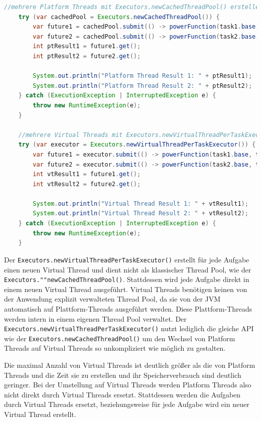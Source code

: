 \documentclass[fontsize=12pt,paper=a4,twoside=semi,parskip=half-,headsepline,headinclude]{scrreprt}
\newcommand{\code}[1]{\texttt{#1}}
\begin{document}
\begin{lstlisting}[language=Java]
	//mehrere Platform Threads mit Executors.newCachedThreadPool() erstellen
	try (var cachedPool = Executors.newCachedThreadPool()) {
		var future1 = cachedPool.submit(() -> powerFunction(task1.base, task1.exponent));
		var future2 = cachedPool.submit(() -> powerFunction(task2.base, task2.exponent));
		int ptResult1 = future1.get();
		int ptResult2 = future2.get();
	
		System.out.println("Platform Thread Result 1: " + ptResult1);
		System.out.println("Platform Thread Result 2: " + ptResult2);
	} catch (ExecutionException | InterruptedException e) {
		throw new RuntimeException(e);
	}

	//mehrere Virtual Threads mit Executors.newVirtualThreadPerTaskExecutor() erstellen
	try (var executor = Executors.newVirtualThreadPerTaskExecutor()) {
		var future1 = executor.submit(() -> powerFunction(task1.base, task1.exponent));
		var future2 = executor.submit(() -> powerFunction(task2.base, task2.exponent));
		int vtResult1 = future1.get();
		int vtResult2 = future2.get();
	
		System.out.println("Virtual Thread Result 1: " + vtResult1);
		System.out.println("Virtual Thread Result 2: " + vtResult2);
	} catch (ExecutionException | InterruptedException e) {
		throw new RuntimeException(e);
	}
\end{lstlisting}
Der \code{Executors.newVirtualThreadPerTaskExecutor()} erstellt für jede Aufgabe einen neuen Virtual Thread und dient nicht als klassischer Thread Pool, wie der \code{Executors.""newCachedThreadPool()}. Stattdessen wird jede Aufgabe direkt in einem neuen Virtual Thread ausgeführt. Virtual Threads benötigen keinen von der Anwendung explizit verwalteten Thread Pool, da sie von der JVM automatisch auf Plattform-Threads ausgeführt werden. Diese Plattform-Threads werden intern in einem eigenen Thread Pool verwaltet. Der \code{Executors.newVirtualThreadPerTaskExecutor()} nutzt lediglich die gleiche API wie der \code{Executors.newCachedThreadPool()} um den Wechsel von Platform Threads auf Virtual Threads so unkompliziert wie möglich zu gestalten.

Die maximal Anzahl von Virtual Threads ist deutlich größer als die von Platform Threads und die Zeit sie zu erstellen und ihr Speicherverbrauch sind deutlich geringer. Bei der Umstellung auf Virtual Threads werden Platform Threads also nicht direkt durch Virtual Threads ersetzt. Stattdessen werden die Aufgaben durch Virtual Threads ersetzt, beziehungsweise für jede Aufgabe wird ein neuer Virtual Thread erstellt. 
\end{document}
